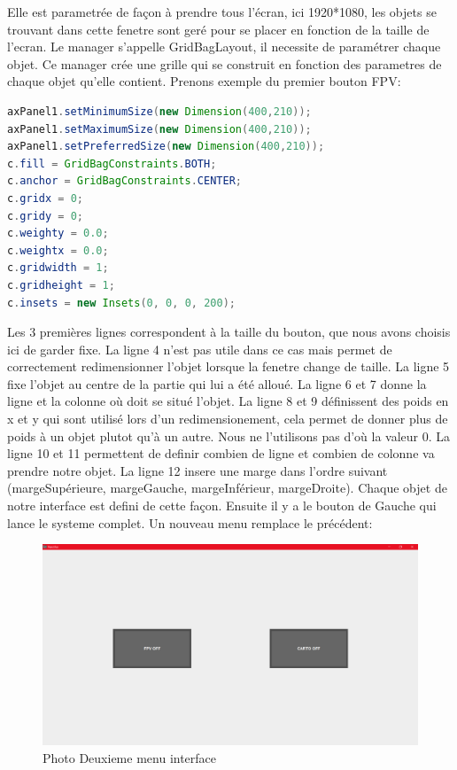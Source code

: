\documentclass[a4paper,11pt]{report}
\begin{document}
				Elle est parametrée de façon à prendre tous l'écran, ici 1920*1080, les objets se trouvant dans cette fenetre sont geré pour se placer en fonction de la taille de l'ecran.
				\newline Le manager s'appelle GridBagLayout, il necessite de paramétrer chaque objet.
				Ce manager crée une grille qui se construit en fonction des parametres de chaque objet qu'elle contient.
				\newpage Prenons exemple du premier bouton FPV:
				\begin{lstlisting}[language=java]
axPanel1.setMinimumSize(new Dimension(400,210));
axPanel1.setMaximumSize(new Dimension(400,210));
axPanel1.setPreferredSize(new Dimension(400,210));
c.fill = GridBagConstraints.BOTH;
c.anchor = GridBagConstraints.CENTER;
c.gridx = 0;
c.gridy = 0;
c.weighty = 0.0;
c.weightx = 0.0;
c.gridwidth = 1;
c.gridheight = 1;
c.insets = new Insets(0, 0, 0, 200);
				\end{lstlisting}
				Les 3 premières lignes correspondent à la taille du bouton, que nous avons choisis ici de garder fixe.
				\newline La ligne 4 n'est pas utile dans ce cas mais permet de correctement redimensionner l'objet lorsque la fenetre change de taille.
				\newline La ligne 5 fixe l'objet au centre de la partie qui lui a été alloué.
				\newline La ligne 6 et 7 donne la ligne et la colonne où doit se situé l'objet.
				\newline La ligne 8 et 9 définissent des poids en x et y qui sont utilisé lors d'un redimensionement, cela permet de donner plus de poids à un objet plutot qu'à un autre. Nous ne l'utilisons pas d'où la valeur 0.
				\newline La ligne 10 et 11 permettent de definir combien de ligne et combien de colonne va prendre notre objet.
				\newline La ligne 12 insere une marge dans l'ordre suivant (margeSupérieure, margeGauche, margeInférieur, margeDroite).
				\newline Chaque objet de notre interface est defini de cette façon.
				\newline Ensuite il y a le bouton de Gauche qui lance le systeme complet. Un nouveau menu remplace le précédent:
				\begin{figure}[!h]
					\begin{center}
						\includegraphics[scale=0.3]{Photos/Interface1.png}
						\caption{Photo Deuxieme menu interface}
					\end{center}
				\end{figure}
\end{document}
